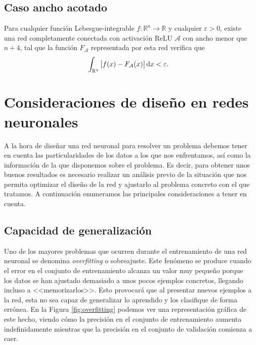 \documentclass[
  a4paper,
  12pt,
  spanish,
]{scrartcl}
\theoremstyle{teorema-style}
\begin{document}
\subsection{Caso ancho acotado}

Para cualquier función Lebesgue-integrable $f: \mathbb{R}^n \rightarrow \mathbb{R}$ y cualquier $\varepsilon >0$, existe una red completamente conectada con activación ReLU \(\mathcal A\) con ancho menor que $n+4$, tal que la función $F_{\mathcal A}$ representada por esta red verifica que
\[
  \displaystyle \int_{\mathbb{R}^{n}}\left|f(x)-F_{\mathcal A}(x)\right|\dif x < \varepsilon.
\]

\section{Consideraciones de diseño en redes neuronales}
\label{sec:diseño}

A la hora de diseñar una red neuronal para resolver un problema debemos tener en cuenta las particularidades de los datos a los que nos enfrentamos, así como la información de la que disponemos sobre el problema. Es decir, para obtener unos buenos resultados es necesario realizar un análisis previo de la situación que nos permita optimizar el diseño de la red y ajustarlo al problema concreto con el que tratamos. A continuación enumeramos las principales consideraciones a tener en cuenta.

\subsection{Capacidad de generalización}

Uno de los mayores problemas que ocurren durante el entrenamiento de una red neuronal se denomina \textit{overfitting} o sobreajuste. Este fenómeno se produce cuando el error en el conjunto de entrenamiento alcanza un valor muy pequeño porque los datos se han ajustado demasiado a unos pocos ejemplos concretos, llegando incluso a <<memorizarlos>>. Esto provocará que al presentar nuevos ejemplos a la red, esta no sea capaz de generalizar lo aprendido y los clasifique de forma errónea. En la Figura \ref{fig:overfitting} podemos ver una representación gráfica de este hecho, viendo cómo la precisión en el conjunto de entrenamiento aumenta indefinidamente mientras que la precisión en el conjunto de validación comienza a caer.
\end{document}
